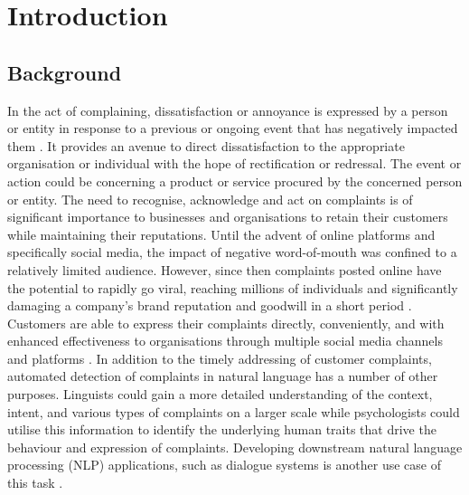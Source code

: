 \chapter{Introduction}

\section{Background}
In the act of complaining, dissatisfaction or annoyance is expressed by a person or entity in response to a previous or ongoing event that has negatively impacted them \cite{olshtain_speechact_1987}. It provides an avenue to direct dissatisfaction to the appropriate organisation or individual with the hope of rectification or redressal. The event or action could be concerning a product or service procured by the concerned person or entity. The need to recognise, acknowledge and act on complaints is of significant importance to businesses and organisations to retain their customers while maintaining their reputations.
\newline \newline
Until the advent of online platforms and specifically social media, the impact of negative word-of-mouth was confined to a relatively limited audience. However, since then complaints posted online have the potential to rapidly go viral, reaching millions of individuals and significantly damaging a company's brand reputation and goodwill in a short period \cite{tripp_when_2011}. Customers are able to express their complaints directly, conveniently, and with enhanced effectiveness to organisations through multiple social media channels and platforms \cite{balaji_customer_2015}.
\newline \newline
In addition to the timely addressing of customer complaints, automated detection of complaints in natural language has a number of other purposes. Linguists could gain a more detailed understanding of the context, intent, and various types of complaints on a larger scale while psychologists could utilise this information to identify the underlying human traits that drive the behaviour and expression of complaints. Developing downstream natural language processing (NLP) applications, such as dialogue systems is another use case of this task \cite{preotiuc-pietro_automatically_2019}.
\newline \newline
